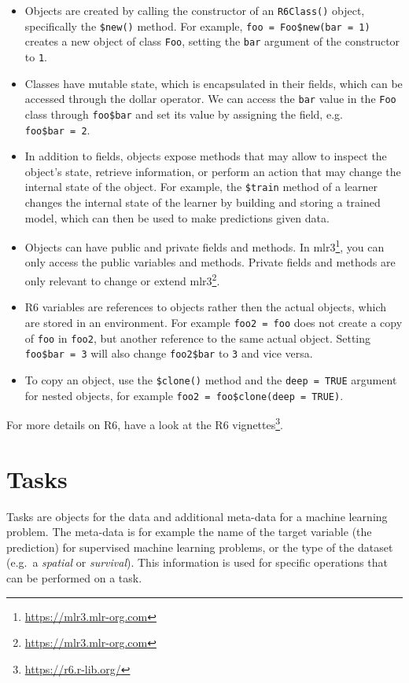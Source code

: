 \documentclass[12pt,]{scrbook}
\providecommand{\tightlist}{%
  \setlength{\itemsep}{0pt}\setlength{\parskip}{0pt}}
\renewcommand{\href}[2]{#2\footnote{\url{#1}}}
\begin{document}
\begin{itemize}
\tightlist
\item
  Objects are created by calling the constructor of an \texttt{R6Class()} object, specifically the \texttt{\$new()} method.
  For example, \texttt{foo\ =\ Foo\$new(bar\ =\ 1)} creates a new object of class \texttt{Foo}, setting the \texttt{bar} argument of the constructor to \texttt{1}.
\item
  Classes have mutable state, which is encapsulated in their fields, which can be accessed through the dollar operator.
  We can access the \texttt{bar} value in the \texttt{Foo} class through \texttt{foo\$bar} and set its value by assigning the field, e.g. \texttt{foo\$bar\ =\ 2}.
\item
  In addition to fields, objects expose methods that may allow to inspect the object's state, retrieve information, or perform an action that may change the internal state of the object.
  For example, the \texttt{\$train} method of a learner changes the internal state of the learner by building and storing a trained model, which can then be used to make predictions given data.
\item
  Objects can have public and private fields and methods.
  In \href{https://mlr3.mlr-org.com}{mlr3}, you can only access the public variables and methods.
  Private fields and methods are only relevant to change or extend \href{https://mlr3.mlr-org.com}{mlr3}.
\item
  R6 variables are references to objects rather then the actual objects, which are stored in an environment.
  For example \texttt{foo2\ =\ foo} does not create a copy of \texttt{foo} in \texttt{foo2}, but another reference to the same actual object.
  Setting \texttt{foo\$bar\ =\ 3} will also change \texttt{foo2\$bar} to \texttt{3} and vice versa.
\item
  To copy an object, use the \texttt{\$clone()} method and the \texttt{deep\ =\ TRUE} argument for nested objects, for example \texttt{foo2\ =\ foo\$clone(deep\ =\ TRUE)}.
\end{itemize}

For more details on R6, have a look at the \href{https://r6.r-lib.org/}{R6 vignettes}.

\hypertarget{tasks}{%
\section{Tasks}\label{tasks}}

Tasks are objects for the data and additional meta-data for a machine learning problem.
The meta-data is for example the name of the target variable (the prediction) for supervised machine learning problems, or the type of the dataset (e.g.~a \emph{spatial} or \emph{survival}).
This information is used for specific operations that can be performed on a task.
\end{document}
